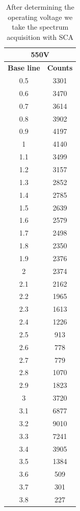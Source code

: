 \documentclass[%
 reprint,
nofootinbib,
 amsmath,amssymb,
 aps,
floatfix,
]{revtex4-2}
\begin{document}
\begin{table}[]
\caption{After determining the operating voltage we take the spectrum acquisition with SCA}
\label{tab:my-table}
\begin{tabular}{@{}cc@{}}
\toprule
\multicolumn{2}{c}{\textbf{550V}} \\ \midrule
\textbf{Base line} & \textbf{Counts} \\
0.5 & 3301 \\
0.6 & 3470 \\
0.7 & 3614 \\
0.8 & 3902 \\
0.9 & 4197 \\
1 & 4140 \\
1.1 & 3499 \\
1.2 & 3157 \\
1.3 & 2852 \\
1.4 & 2785 \\
1.5 & 2639 \\
1.6 & 2579 \\
1.7 & 2498 \\
1.8 & 2350 \\
1.9 & 2376 \\
2 & 2374 \\
2.1 & 2162 \\
2.2 & 1965 \\
2.3 & 1613 \\
2.4 & 1226 \\
2.5 & 913 \\
2.6 & 778 \\
2.7 & 779 \\
2.8 & 1070 \\
2.9 & 1823 \\
3 & 3720 \\
3.1 & 6877 \\
3.2 & 9010 \\
3.3 & 7241 \\
3.4 & 3905 \\
3.5 & 1384 \\
3.6 & 509 \\
3.7 & 301 \\
3.8 & 227 \\ \bottomrule
\end{tabular}
\end{table}
\end{document}
